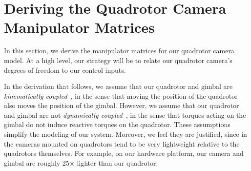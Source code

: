 % 







\section{Deriving the Quadrotor Camera Manipulator Matrices}

In this section, we derive the manipulator matrices for our quadrotor camera model.
At a high level, our strategy will be to relate our quadrotor camera's degrees of freedom to our control inputs.

In the derivation that follows, we assume that our quadrotor and gimbal are \emph{kinematically coupled}~\cite{kondak:2013}, in the sense that moving the position of the quadrotor also moves the position of the gimbal. However, we assume that our quadrotor and gimbal are not \emph{dynamically coupled}~\cite{kondak:2013}, in the sense that torques acting on the gimbal do not induce reactive torques on the quadrotor.
These assumptions simplify the modeling of our system. Moreover, we feel they are justified, since in the cameras mounted on quadrotors tend to be very lightweight relative to the quadrotors themselves. For example, on our hardware platform, our camera and gimbal are roughly 25$\times$ lighter than our quadrotor.

